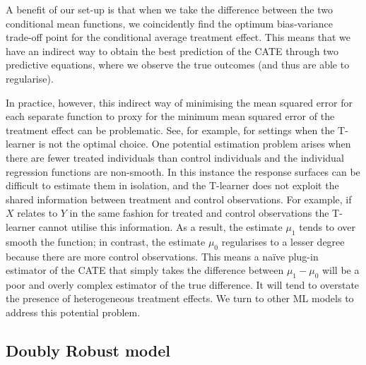 \documentclass[12pt, a4paper]{article}
\begin{document}
A benefit of our set-up is that when we take the difference between the two conditional mean functions, we coincidently find the optimum bias-variance trade-off point for the conditional average treatment effect. This means that we have an indirect way to obtain the best prediction of the CATE through two predictive equations, where we observe the true outcomes (and thus are able to regularise).

In practice, however, this indirect way of minimising the mean squared error
for each separate function to proxy for the minimum mean squared error of the
treatment effect can be problematic. See, for example,
\cite{kunzel2019,kennedy2020} for settings when the T-learner is not the
optimal choice. One potential estimation problem arises when there are fewer
treated individuals than control individuals and the individual regression
functions are non-smooth. In this instance the response surfaces can be
difficult to estimate them in isolation, and the T-learner does not exploit the
shared information between treatment and control observations. For example, if
$X$ relates to $Y$ in the same fashion for treated and control observations the
T-learner cannot utilise this information. As a result, the estimate $\mu_1$
tends to over smooth the function; in contrast, the estimate $\mu_0$
regularises to a lesser degree because there are more control observations.
This means a na\"ive plug-in estimator of the CATE that simply takes the
difference between $\mu_1 - \mu_0$ will be a poor and overly complex estimator
of the true difference. It will tend to overstate the presence of heterogeneous
treatment effects. We turn to other ML models to address this potential
problem.

\subsection{Doubly Robust model}
\end{document}
